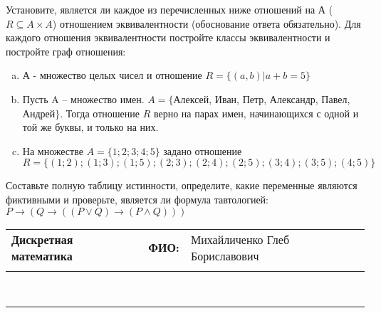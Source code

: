 \documentclass[10pt]{exam}
\newcommand{\class}{Дискретная математика}
\newcommand{\examdate}{}
\begin{document}
\begin{questions}
\question
Установите, является ли каждое из перечисленных ниже отношений на А ($R \subseteq A \times A$) отношением эквивалентности (обоснование ответа обязательно). Для каждого отношения эквивалентности постройте классы 
эквивалентности и постройте граф отношения:
\begin{enumerate} [a)]\setcounter{enumi}{0}
\item А - множество целых чисел и отношение $R = \{(a,b)|a + b = 5\}$
\item Пусть A – множество имен. $A = \{ $Алексей, Иван, Петр, Александр, Павел, Андрей$ \}$. Тогда отношение $R $ верно на парах имен, начинающихся с одной и той же буквы, и только на них.
\item На множестве $A = \{1; 2; 3; 4; 5\}$ задано отношение $R = \{(1; 2); (1; 3); (1; 5); (2; 3); (2; 4); (2; 5); (3; 4); (3; 5); (4; 5)\}$
\end{enumerate}\question Составьте полную таблицу истинности, определите, какие переменные являются фиктивными и проверьте, является ли формула тавтологией:
$ P \rightarrow (Q \rightarrow ((P \lor Q) \rightarrow (P \land Q)))$

\end{questions}
\newpage
\begin{flushright}
\begin{tabular}{p{2.8in} r l}
\textbf{\class} & \textbf{ФИО:} &Михайличенко Глеб Бориславович
\\

\textbf{\examdate} &&\\
\end{tabular}\\
\end{flushright}
\rule[1ex]{\textwidth}{.1pt}
\end{document}
